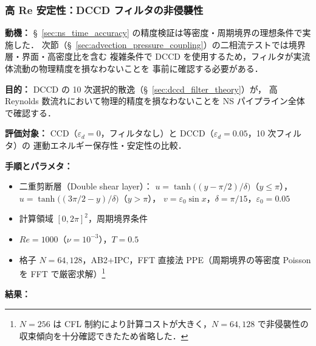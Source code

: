 %
\subsubsection{高 Re 安定性：DCCD フィルタの非侵襲性}
\label{sec:highre_dccd}

\noindent\textbf{動機：}
§~\ref{sec:ns_time_accuracy} の精度検証は等密度・周期境界の理想条件で実施した．
次節（§~\ref{sec:advection_pressure_coupling}）の二相流テストでは境界層・界面・高密度比を含む
複雑条件で DCCD を使用するため，フィルタが実流体流動の物理精度を損なわないことを
事前に確認する必要がある．

\noindent\textbf{目的：}
DCCD の 10 次選択的散逸（§~\ref{sec:dccd_filter_theory}）が，
高 Reynolds 数流れにおいて物理的精度を損なわないことを NS パイプライン全体で確認する．

\noindent\textbf{評価対象：}
CCD（$\varepsilon_d = 0$，フィルタなし）と
DCCD（$\varepsilon_d = 0.05$，10 次フィルタ）の
運動エネルギー保存性・安定性の比較．

\noindent\textbf{手順とパラメタ：}
\begin{itemize}[noitemsep]
  \item 二重剪断層（Double shear layer）：
        $u = \tanh\bigl((y - \pi/2)/\delta\bigr)$（$y \leq \pi$），
        $u = \tanh\bigl((3\pi/2 - y)/\delta\bigr)$（$y > \pi$），
        $v = \varepsilon_0\sin x$，$\delta = \pi/15$，$\varepsilon_0 = 0.05$
  \item 計算領域 $[0, 2\pi]^2$，周期境界条件
  \item $\mathit{Re} = 1000$（$\nu = 10^{-3}$），$T = 0.5$
  \item 格子 $N = 64, 128$，AB2+IPC，FFT 直接法 PPE（周期境界の等密度 Poisson を FFT で厳密求解）\footnote{$N = 256$ は CFL 制約により計算コストが大きく，$N = 64, 128$ で非侵襲性の収束傾向を十分確認できたため省略した．}
\end{itemize}

\noindent\textbf{結果：}

